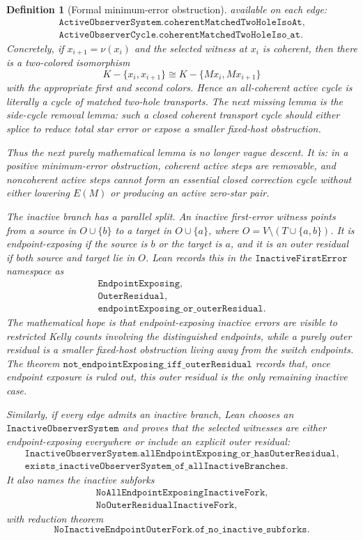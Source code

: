 \documentclass[11pt]{article}
\newtheorem{definition}{Definition}
\begin{document}
\begin{definition}[Formal minimum-error obstruction]
available on each edge:
\[
\begin{array}{l}
\texttt{ActiveObserverSystem.coherentMatchedTwoHoleIsoAt},\\
\texttt{ActiveObserverCycle.coherentMatchedTwoHoleIso\_at}.
\end{array}
\]
Concretely, if \(x_{i+1}=\nu(x_i)\) and the selected witness at \(x_i\) is
coherent, then there is a two-colored isomorphism
\[
  K-\{x_i,x_{i+1}\}
  \cong
  K-\{Mx_i,Mx_{i+1}\}
\]
with the appropriate first and second colors.  Hence an all-coherent active
cycle is literally a cycle of matched two-hole transports.  The next missing
lemma is the side-cycle removal lemma: such a closed coherent transport cycle
should either splice to reduce total star error or expose a smaller fixed-host
obstruction.

Thus the next purely mathematical lemma is no longer vague descent.  It is:
in a positive minimum-error obstruction, coherent active steps are removable,
and noncoherent active steps cannot form an essential closed correction cycle
without either lowering \(E(M)\) or producing an active zero-star pair.

The inactive branch has a parallel split.  An inactive first-error witness
points from a source in \(O\cup\{b\}\) to a target in \(O\cup\{a\}\), where
\(O=V\setminus(T\cup\{a,b\})\).  It is endpoint-exposing if the source is
\(b\) or the target is \(a\), and it is an outer residual if both source and
target lie in \(O\).  Lean records this in the
\(\texttt{InactiveFirstError}\) namespace as
\[
\begin{array}{l}
\texttt{EndpointExposing},\\
\texttt{OuterResidual},\\
\texttt{endpointExposing\_or\_outerResidual}.
\end{array}
\]
The mathematical hope is that endpoint-exposing inactive errors are visible to
restricted Kelly counts involving the distinguished endpoints, while a purely
outer residual is a smaller fixed-host obstruction living away from the switch
endpoints.  The theorem
\(\texttt{not\_endpointExposing\_iff\_outerResidual}\) records that, once
endpoint exposure is ruled out, this outer residual is the only remaining
inactive case.

Similarly, if every edge admits an inactive branch, Lean chooses an
\(\texttt{InactiveObserverSystem}\) and proves that the selected witnesses are
either endpoint-exposing everywhere or include an explicit outer residual:
\[
\begin{array}{l}
\texttt{InactiveObserverSystem.allEndpointExposing\_or\_hasOuterResidual},\\
\texttt{exists\_inactiveObserverSystem\_of\_allInactiveBranches}.
\end{array}
\]
It also names the inactive subforks
\[
\begin{array}{l}
\texttt{NoAllEndpointExposingInactiveFork},\\
\texttt{NoOuterResidualInactiveFork},
\end{array}
\]
with reduction theorem
\[
  \texttt{NoInactiveEndpointOuterFork.of\_no\_inactive\_subforks}.
\]


\end{definition}
\end{document}
